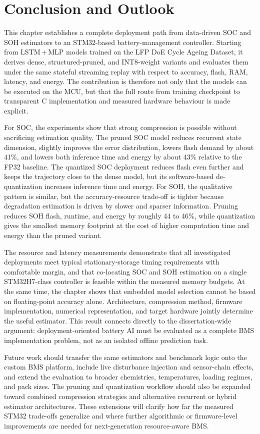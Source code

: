 \documentclass[
    a4paper,
    12pt,
    titlepage,
    bibliography=totoc,
    twoside=on,
    parskip=false,
    numbers=noenddot,
    cleardoublepage=empty,
    DIV=12,
    BCOR=12.0mm,
    headheight=36pt,
    headings=openright
]{scrreprt}
\begin{document}
\section{Conclusion and Outlook}
This chapter establishes a complete deployment path from data-driven SOC and SOH estimators to an STM32-based battery-management controller. Starting from LSTM\,+\,MLP models trained on the LFP DoE Cycle Ageing Dataset, it derives dense, structured-pruned, and INT8-weight variants and evaluates them under the same stateful streaming replay with respect to accuracy, flash, RAM, latency, and energy. The contribution is therefore not only that the models can be executed on the MCU, but that the full route from training checkpoint to transparent C implementation and measured hardware behaviour is made explicit.

For SOC, the experiments show that strong compression is possible without sacrificing estimation quality. The pruned SOC model reduces recurrent state dimension, slightly improves the error distribution, lowers flash demand by about 41\%, and lowers both inference time and energy by about 43\% relative to the FP32 baseline. The quantized SOC deployment reduces flash even further and keeps the trajectory close to the dense model, but its software-based de-quantization increases inference time and energy. For SOH, the qualitative pattern is similar, but the accuracy-resource trade-off is tighter because degradation estimation is driven by slower and sparser information. Pruning reduces SOH flash, runtime, and energy by roughly 44 to 46\%, while quantization gives the smallest memory footprint at the cost of higher computation time and energy than the pruned variant.

The resource and latency measurements demonstrate that all investigated deployments meet typical stationary-storage timing requirements with comfortable margin, and that co-locating SOC and SOH estimation on a single STM32H7-class controller is feasible within the measured memory budgets. At the same time, the chapter shows that embedded model selection cannot be based on floating-point accuracy alone. Architecture, compression method, firmware implementation, numerical representation, and target hardware jointly determine the useful estimator. This result connects directly to the dissertation-wide argument: deployment-oriented battery AI must be evaluated as a complete BMS implementation problem, not as an isolated offline prediction task.

Future work should transfer the same estimators and benchmark logic onto the custom BMS platform, include live disturbance injection and sensor-chain effects, and extend the evaluation to broader chemistries, temperatures, loading regimes, and pack sizes. The pruning and quantization workflow should also be expanded toward combined compression strategies and alternative recurrent or hybrid estimator architectures. These extensions will clarify how far the measured STM32 trade-offs generalize and where further algorithmic or firmware-level improvements are needed for next-generation resource-aware BMS.
\end{document}
